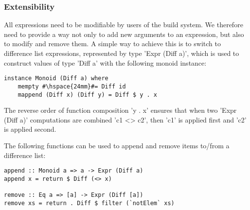 \subsubsection{Extensibility}

All expressions need to be modifiable by users of the build system. We therefore
need to provide a way not only to add new arguments to an expression, but also
to modify and remove them. A simple way to achieve this is to switch to difference
list expressions, represented by type \lst'Expr (Diff a)', which is used to
construct values of type \lst'Diff a' with the following monoid instance:

\begin{lstlisting}
instance Monoid (Diff a) where
    mempty #\hspace{24mm}#= Diff id
    mappend (Diff x) (Diff y) = Diff $ y . x
\end{lstlisting}

\noindent The reverse order of function composition \lst'y . x' ensures that
when two \lst'Expr (Diff a)' computations are combined \lst'c1 <> c2', then
\lst'c1' is applied first and \lst'c2' is applied second.

The following functions can be used to append and remove items to/from a
difference list:

\begin{lstlisting}
append :: Monoid a => a -> Expr (Diff a)
append x = return $ Diff (<> x)

remove :: Eq a => [a] -> Expr (Diff [a])
remove xs = return . Diff $ filter (`notElem` xs)
\end{lstlisting}

\newcommand{\tabx}[1]{\hspace{.106\textwidth}\rlap{#1}}
\newcommand{\taby}[1]{\hspace{.114\textwidth}\rlap{#1}}
\newcommand{\tabz}[1]{\hspace{.24\textwidth}\rlap{#1}}

